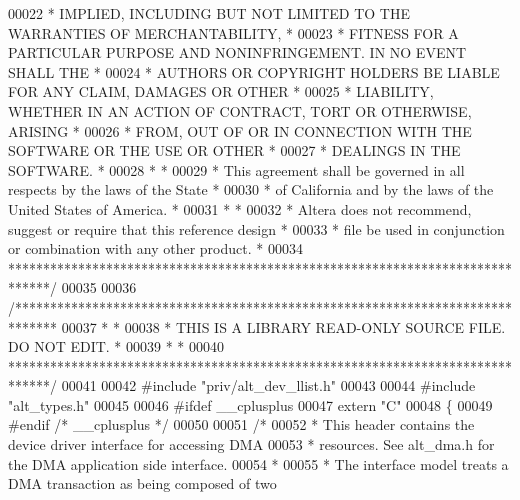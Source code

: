 \begin{DoxyCode}
00022 \textcolor{comment}{* IMPLIED, INCLUDING BUT NOT LIMITED TO THE WARRANTIES OF MERCHANTABILITY,    *}
00023 \textcolor{comment}{* FITNESS FOR A PARTICULAR PURPOSE AND NONINFRINGEMENT. IN NO EVENT SHALL THE *}
00024 \textcolor{comment}{* AUTHORS OR COPYRIGHT HOLDERS BE LIABLE FOR ANY CLAIM, DAMAGES OR OTHER      *}
00025 \textcolor{comment}{* LIABILITY, WHETHER IN AN ACTION OF CONTRACT, TORT OR OTHERWISE, ARISING     *}
00026 \textcolor{comment}{* FROM, OUT OF OR IN CONNECTION WITH THE SOFTWARE OR THE USE OR OTHER         *}
00027 \textcolor{comment}{* DEALINGS IN THE SOFTWARE.                                                   *}
00028 \textcolor{comment}{*                                                                             *}
00029 \textcolor{comment}{* This agreement shall be governed in all respects by the laws of the State   *}
00030 \textcolor{comment}{* of California and by the laws of the United States of America.              *}
00031 \textcolor{comment}{*                                                                             *}
00032 \textcolor{comment}{* Altera does not recommend, suggest or require that this reference design    *}
00033 \textcolor{comment}{* file be used in conjunction or combination with any other product.          *}
00034 \textcolor{comment}{******************************************************************************/}
00035 
00036 \textcolor{comment}{/******************************************************************************}
00037 \textcolor{comment}{*                                                                             *}
00038 \textcolor{comment}{* THIS IS A LIBRARY READ-ONLY SOURCE FILE. DO NOT EDIT.                       *}
00039 \textcolor{comment}{*                                                                             *}
00040 \textcolor{comment}{******************************************************************************/}
00041 
00042 \textcolor{preprocessor}{#include "priv/alt_dev_llist.h"}
00043 
00044 \textcolor{preprocessor}{#include "alt_types.h"}
00045 
00046 \textcolor{preprocessor}{#ifdef \_\_cplusplus}
00047 \textcolor{keyword}{extern} \textcolor{stringliteral}{"C"}
00048 \{
00049 \textcolor{preprocessor}{#endif }\textcolor{comment}{/* \_\_cplusplus */}\textcolor{preprocessor}{}
00050 
00051 \textcolor{comment}{/*}
00052 \textcolor{comment}{ * This header contains the device driver interface for accessing DMA }
00053 \textcolor{comment}{ * resources. See alt\_dma.h for the DMA application side interface.}
00054 \textcolor{comment}{ *}
00055 \textcolor{comment}{ * The interface model treats a DMA transaction as being composed of two }

\end{DoxyCode}

